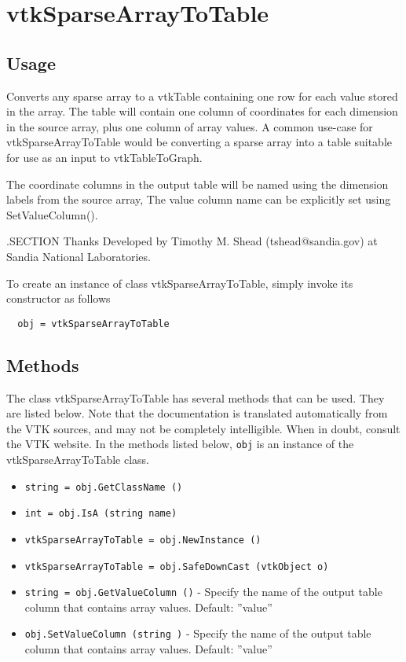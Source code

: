 \section{vtkSparseArrayToTable}

\subsection{Usage}

 Converts any sparse array to a vtkTable containing one row for each value
 stored in the array.  The table will contain one column of coordinates for each
 dimension in the source array, plus one column of array values.  A common use-case
 for vtkSparseArrayToTable would be converting a sparse array into a table
 suitable for use as an input to vtkTableToGraph.

 The coordinate columns in the output table will be named using the dimension labels
 from the source array,  The value column name can be explicitly set using
 SetValueColumn().

 .SECTION Thanks
 Developed by Timothy M. Shead (tshead@sandia.gov) at Sandia National Laboratories.

To create an instance of class vtkSparseArrayToTable, simply
invoke its constructor as follows
\begin{verbatim}
  obj = vtkSparseArrayToTable
\end{verbatim}
\subsection{Methods}

The class vtkSparseArrayToTable has several methods that can be used.
  They are listed below.
Note that the documentation is translated automatically from the VTK sources,
and may not be completely intelligible.  When in doubt, consult the VTK website.
In the methods listed below, \verb|obj| is an instance of the vtkSparseArrayToTable class.
\begin{itemize}
\item  \verb|string = obj.GetClassName ()|

\item  \verb|int = obj.IsA (string name)|

\item  \verb|vtkSparseArrayToTable = obj.NewInstance ()|

\item  \verb|vtkSparseArrayToTable = obj.SafeDownCast (vtkObject o)|

\item  \verb|string = obj.GetValueColumn ()| -  Specify the name of the output table column that contains array values.
 Default: ''value''

\item  \verb|obj.SetValueColumn (string )| -  Specify the name of the output table column that contains array values.
 Default: ''value''

\end{itemize}

